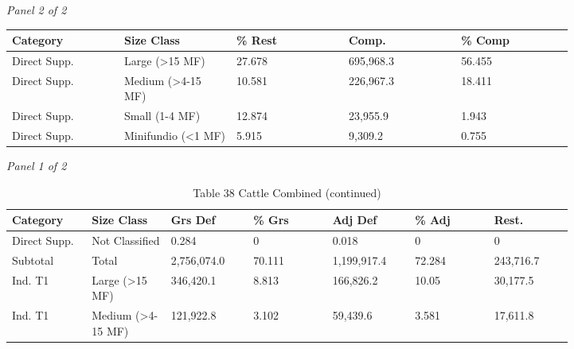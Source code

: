 \documentclass[12pt]{article}
\begin{document}
\begin{landscape}
\begin{table}[H]
\textit{Panel 2 of 2}\\[2pt]
{\fontsize{12}{14}\selectfont
\setlength{\tabcolsep}{3pt}
\renewcommand{\arraystretch}{1.08}
\begin{tabular}{p{0.164\linewidth}p{0.164\linewidth}p{0.164\linewidth}p{0.164\linewidth}p{0.164\linewidth}}
\toprule
Category & Size Class & \% Rest & Comp. & \% Comp \\
\midrule
Direct Supp. & Large (>15 MF) & 27.678 & 695,968.3 & 56.455 \\
Direct Supp. & Medium (>4-15 MF) & 10.581 & 226,967.3 & 18.411 \\
Direct Supp. & Small (1-4 MF) & 12.874 & 23,955.9 & 1.943 \\
Direct Supp. & Minifundio (<1 MF) & 5.915 & 9,309.2 & 0.755 \\
\bottomrule
\end{tabular}
}
\end{table}
\begin{table}[H]
\centering
\caption{Table 38 Cattle Combined (continued)}
\textit{Panel 1 of 2}\\[2pt]
{\fontsize{12}{14}\selectfont
\setlength{\tabcolsep}{3pt}
\renewcommand{\arraystretch}{1.08}
\begin{tabular}{p{0.117\linewidth}p{0.117\linewidth}p{0.117\linewidth}p{0.117\linewidth}p{0.117\linewidth}p{0.117\linewidth}p{0.117\linewidth}}
\toprule
Category & Size Class & Grs Def & \% Grs & Adj Def & \% Adj & Rest. \\
\midrule
Direct Supp. & Not Classified & 0.284 & 0 & 0.018 & 0 & 0 \\
Subtotal & Total & 2,756,074.0 & 70.111 & 1,199,917.4 & 72.284 & 243,716.7 \\
Ind. T1 & Large (>15 MF) & 346,420.1 & 8.813 & 166,826.2 & 10.05 & 30,177.5 \\
Ind. T1 & Medium (>4-15 MF) & 121,922.8 & 3.102 & 59,439.6 & 3.581 & 17,611.8 \\
\bottomrule
\end{tabular}
}

\vspace{0.6em}


\end{table}
\end{landscape}
\end{document}
